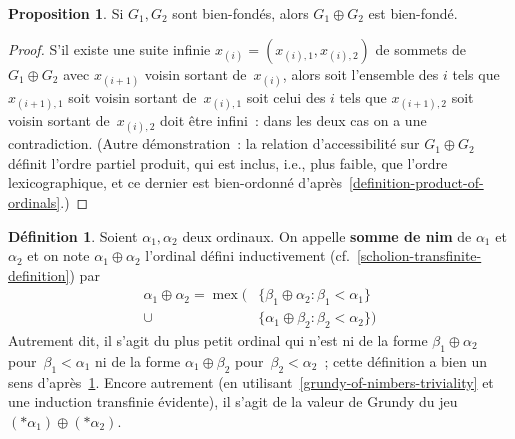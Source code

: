 \documentclass[12pt,a4paper]{article}
\theoremstyle{definition}
\newtheorem{defn}[comcnt]{Définition}
\newtheorem{prop}[comcnt]{Proposition}
\newcommand{\mex}{\operatorname{mex}}
\newcommand{\defin}[2][]{\def\latexsucks{#1}\ifx\latexsucks\empty\index{#2}\else\index{\latexsucks}\fi\textbf{#2}}
\begin{document}
\begin{prop}\label{nim-sum-is-well-founded}
Si $G_1,G_2$ sont bien-fondés, alors $G_1\oplus G_2$ est bien-fondé.
\end{prop}
\begin{proof}
S'il existe une suite infinie $x_{(i)} = (x_{(i),1}, x_{(i),2})$ de
sommets de $G_1 \oplus G_2$ avec $x_{(i+1)}$ voisin sortant
de $x_{(i)}$, alors soit l'ensemble des $i$ tels que $x_{(i+1),1}$
soit voisin sortant de $x_{(i),1}$ soit celui des $i$ tels que
$x_{(i+1),2}$ soit voisin sortant de $x_{(i),2}$ doit être infini :
dans les deux cas on a une contradiction.  (Autre démonstration : la
relation d'accessibilité sur $G_1\oplus G_2$ définit l'ordre partiel
produit, qui est inclus, i.e., plus faible, que l'ordre
lexicographique, et ce dernier est bien-ordonné
d'après \ref{definition-product-of-ordinals}.)
\end{proof}

\begin{defn}\label{definition-nim-sum-of-ordinals}
Soient $\alpha_1,\alpha_2$ deux ordinaux.  On appelle \defin{somme de
  nim} de $\alpha_1$ et $\alpha_2$ et on note $\alpha_1 \oplus
\alpha_2$ l'ordinal défini inductivement
(cf. \ref{scholion-transfinite-definition}) par
\begin{align*}
\alpha_1 \oplus \alpha_2 = \mex\big(
& \{\beta_1\oplus\alpha_2 : \beta_1 < \alpha_1\}\\
\cup\, & \{\alpha_1\oplus\beta_2 : \beta_2 < \alpha_2\}\big)
\end{align*}
Autrement dit, il s'agit du plus petit ordinal qui n'est ni de la
forme $\beta_1\oplus\alpha_2$ pour $\beta_1 < \alpha_1$ ni de la forme
$\alpha_1\oplus\beta_2$ pour $\beta_2 < \alpha_2$ ; cette définition a
bien un sens d'après \ref{nim-sum-is-well-founded}.  Encore autrement
(en utilisant \ref{grundy-of-nimbers-triviality} et une induction
transfinie évidente), il s'agit de la valeur de Grundy du jeu
$(*\alpha_1) \oplus (*\alpha_2)$.
\end{defn}
\end{document}
